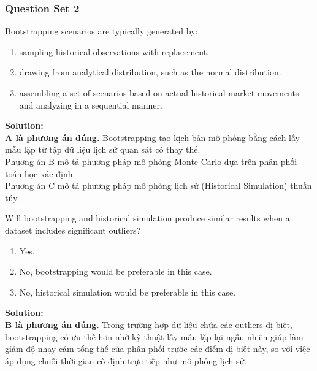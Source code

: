 \subsubsection{Question Set 2}
\label{subsec:app_mod9_Question_Set_2}

\begin{tcolorbox}[
	colback=gray!5!white,
	colframe=black!15!white,
	boxrule=0.5pt,
	arc=3pt,
	title=\textbf{Question 1},
	coltitle=black,
	colbacktitle=black!5!white,
	before skip=6pt,
	after skip=6pt,
	breakable
]
Bootstrapping scenarios are typically generated by:
\begin{enumerate}[label=\Alph*.]
	\item sampling historical observations with replacement.
	\item drawing from analytical distribution, such as the normal distribution.
	\item assembling a set of scenarios based on actual historical market movements and analyzing in a sequential manner.
\end{enumerate}

\textbf{Solution:} \\
\textbf{A là phương án đúng.} Bootstrapping tạo kịch bản mô phỏng bằng cách lấy mẫu lặp từ tập dữ liệu lịch sử quan sát có thay thế. \\
Phương án B mô tả phương pháp mô phỏng Monte Carlo dựa trên phân phối toán học xác định. \\
Phương án C mô tả phương pháp mô phỏng lịch sử (Historical Simulation) thuần túy.
\end{tcolorbox}

\begin{tcolorbox}[
	colback=gray!5!white,
	colframe=black!15!white,
	boxrule=0.5pt,
	arc=3pt,
	title=\textbf{Question 2},
	coltitle=black,
	colbacktitle=black!5!white,
	before skip=6pt,
	after skip=6pt,
	breakable
]
Will bootstrapping and historical simulation produce similar results when a dataset includes significant outliers?
\begin{enumerate}[label=\Alph*.]
	\item Yes.
	\item No, bootstrapping would be preferable in this case.
	\item No, historical simulation would be preferable in this case.
\end{enumerate}

\textbf{Solution:} \\
\textbf{B là phương án đúng.} Trong trường hợp dữ liệu chứa các outliers dị biệt, bootstrapping có ưu thế hơn nhờ kỹ thuật lấy mẫu lặp lại ngẫu nhiên giúp làm giảm độ nhạy cảm tổng thể của phân phối trước các điểm dị biệt này, so với việc áp dụng chuỗi thời gian cố định trực tiếp như mô phỏng lịch sử.
\end{tcolorbox}

